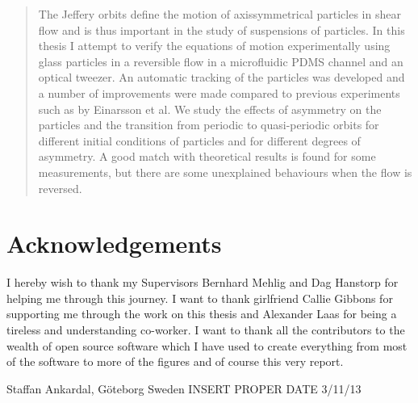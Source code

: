 \begin{abstract}
The Jeffery orbits define the motion of axissymmetrical particles in shear flow and is thus important in the study of suspensions of particles. In this thesis I attempt to verify the equations of motion experimentally using glass particles in a reversible flow in a microfluidic PDMS channel and an optical tweezer. An automatic tracking of the particles was developed and a number of improvements were made compared to previous experiments such as by Einarsson et al\cite{JonasExperiment}. We study the effects of asymmetry on the particles and the transition from periodic to quasi-periodic orbits for different initial conditions of particles and for different degrees of asymmetry. A good match with theoretical results is found for some measurements, but there are some unexplained behaviours when the  flow is reversed.
\end{abstract}

\newpage
\clearpage
\mbox{}
\thispagestyle{empty}
\section*{Acknowledgements}
I hereby wish to thank my Supervisors Bernhard Mehlig and Dag Hanstorp for helping me through this journey. I want to thank girlfriend Callie Gibbons for supporting me through the work on this thesis and Alexander Laas for being a tireless and understanding co-worker. I want to thank all the contributors to the wealth of open source software which I have used to create everything from most of the software to more of the figures and of course this very report. 

\hfill Staffan Ankardal, Göteborg Sweden INSERT PROPER DATE 3/11/13

